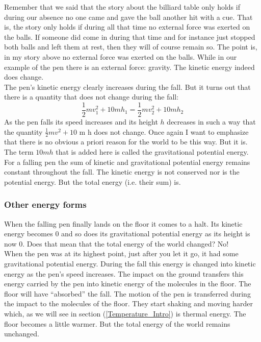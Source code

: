 \noindent Remember that we said that the story about the billiard table only holds if during our absence no one came and gave the ball another hit with a cue. That is, the story only holds if during all that time no external force was exerted on the balls. If someone did come in during that time and for instance just stopped both balls and left them at rest, then they will of course remain so. The point is, in my story above no external force was exerted on the balls. While in our example of the pen there is an external force: gravity. The kinetic energy indeed does change.\\

\noindent The pen's kinetic energy clearly increases during the fall. But it turns out that there is a quantity that does not change during the fall:
\begin{equation}
\frac{1}{2} m v_1^2 + 10 m h_1 = \frac{1}{2} m v_2^2 + 10 m h_2
\end{equation}
As the pen falls its speed increases and its height $h$ decreases in such a way that the quantity $\frac{1}{2} m v^2 + 10$ m h does not change. Once again I want to emphasize that there is no obvious a priori reason for the world to be this way. But it is. The term $10 m h$ that is added here is called the gravitational potential energy. For a falling pen the sum of kinetic and gravitational potential energy remains constant throughout the fall. The kinetic energy is not conserved nor is the potential energy. But the total energy (i.e. their sum) is.

\subsubsection{Other energy forms}

\noindent When the falling pen finally lands on the floor it comes to a halt. Its kinetic energy becomes 0 and so does its gravitational potential energy as its height is now 0. Does that mean that the total energy of the world changed? No!\\

\noindent When the pen was at its highest point, just after you let it go, it had some gravitational potential energy. During the fall this energy is changed into kinetic energy as the pen's speed increases. The impact on the ground transfers this energy carried by the pen into kinetic energy of the molecules in the floor. The floor will have "`absorbed"' the fall. The motion of the pen is transferred during the impact to the molecules of the floor. They start shaking and moving harder which, as we will see in section (\ref{Temperature_Intro}) is thermal energy. The floor becomes a little warmer. But the total energy of the world remains unchanged.\\

